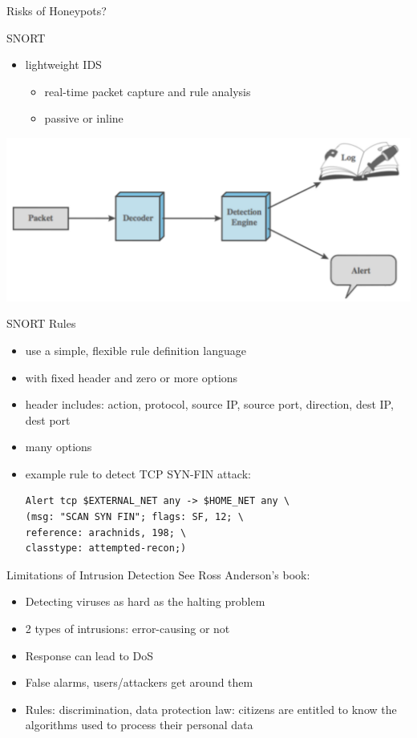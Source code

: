 \documentclass{beamer}
\begin{document}
\begin{frame}{Risks of Honeypots?}
\end{frame}

\begin{frame}{SNORT}
  \begin{itemize}
  \item lightweight IDS 
    \begin{itemize}
    \item real-time packet capture and rule analysis 
    \item passive or inline
    \end{itemize}
  \end{itemize}
   \begin{center}
    \includegraphics[width=1\linewidth]{snort}
  \end{center}
\end{frame}

\begin{frame}[fragile]{SNORT Rules}
  \begin{itemize}
  \item use a simple, flexible rule definition language 
  \item with fixed header and zero or more options 
  \item header includes: action, protocol, source IP, source 
    port, direction, dest IP, dest port 
  \item many options 
  \item example rule to detect TCP SYN-FIN attack:   
    \begin{verbatim}
Alert tcp $EXTERNAL_NET any -> $HOME_NET any \
(msg: "SCAN SYN FIN"; flags: SF, 12; \
reference: arachnids, 198; \
classtype: attempted-recon;)
    \end{verbatim}
  \end{itemize}
\end{frame}

\begin{frame}{Limitations of Intrusion Detection}
See Ross Anderson's book: 
  \begin{itemize}
  \item Detecting viruses as hard as the halting problem 
  \item 2 types of intrusions: error-causing or not 
  \item Response can lead to DoS
  \item False alarms, users/attackers get around them 
  \item Rules: discrimination, data protection law: citizens are 
    entitled to know the algorithms used to process their 
    personal data
  \end{itemize}
\end{frame}
\end{document}
